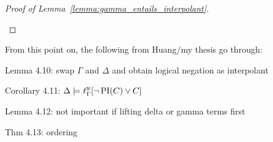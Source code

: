 \begin{proof}[Proof of Lemma~\ref{lemma:gamma_entails_interpolant}]
\begin{description}
\begin{comment}
			By the rule: $s\sigma = r\sigma$, hence also $\lifdelta{s\sigma} = \lifdelta{r\sigma}$ and $\lifdelta{s}\sigma' = \lifdelta{r}\sigma'$ REALLY TRUE? -- think so\dots

			Suppose $M \entails \Gamma$ and $M \not \entails (\lifdelta{D}\sigma' \lor \lifdelta{E[t]}\sigma') $.

			Suppose $M \entails \lifdelta{s}\sigma' = \lifdelta{t}\sigma'$.

			By induction hypothesis (and lemma 11 (huang) and adding the substitution $\sigma'$), 
			$\Gamma \entails \lifdelta{\PI(C_2)}\sigma' \lor \lifdelta{(E[r])}\sigma'$.

			However by assumption $\Gamma \not \entails \lifdelta{E[t]}\sigma'$.

			Hence $\Gamma \not \entails \lifdelta{E[s]}\sigma'$, and
			$\Gamma \not \entails \lifdelta{E[r]}\sigma'$. Therefore $\Gamma \entails \lifdelta{\PI(C_2)}\sigma'$.


			Suppose on the other hand $M \entails \lifdelta{s}\sigma' \neq \lifdelta{t}\sigma'$.

			By the induction hypothesis, 
			$M \entails \lifdelta{\PI(C_1)}\sigma' \lor (\lifdelta{D}\sigma'\lor (\lifdelta{s}=\lifdelta{t})\sigma')$,
			hence then $M \entails \lifdelta{\PI(C_1)}\sigma'$.

			Consequently, 
			$M \entails (\lifdelta{s}\sigma' \neq \lifdelta{t}\sigma' \land \lifdelta{\PI(C_1)}\sigma') \lor (\lifdelta{s}\sigma' = \lifdelta{t}\sigma' \land \lifdelta{\PI(C_2)}\sigma')$.

			By lemma 11 (huang), 
			$M \entails \lifdelta{s \neq {t} \land {\PI(C_1)} \lor ({s} = {t} \land \PI(C_2))}\sigma'$.

			Hence 
			$\Gamma \entails \lifdelta{(s \neq {t} \land {\PI(C_1)} \lor ({s} = {t} \land \PI(C_2))}\sigma' \lor (\lifdelta{D} \lor \lifdelta{E[t]})\sigma') $.

			is this really what i need to show?
		\end{comment}
\end{description}
\end{proof}




From this point on, the following from Huang/my thesis go through:\nopagebreak

Lemma 4.10: swap $\Gamma$ and $\Delta$ and obtain logical negation as interpolant 

Corollary 4.11: $\Delta \models \ell_{\Gamma}^{y}[ \lnot \operatorname{PI}(C) \lor C]$ 

Lemma 4.12: not important if lifting delta or gamma terms first 

Thm 4.13: ordering 

